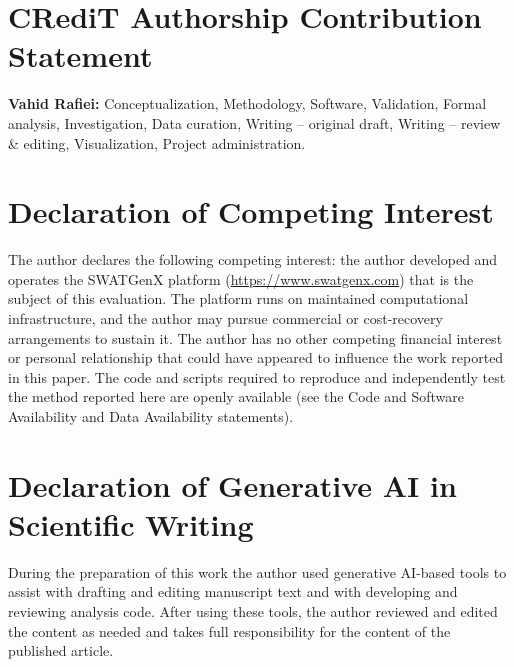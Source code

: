 \section*{CRediT Authorship Contribution Statement}

\textbf{Vahid Rafiei:} Conceptualization, Methodology, Software, Validation, Formal analysis, Investigation, Data curation, Writing -- original draft, Writing -- review \& editing, Visualization, Project administration.

\section*{Declaration of Competing Interest}

The author declares the following competing interest: the author developed and operates the SWATGenX platform (\url{https://www.swatgenx.com}) that is the subject of this evaluation. The platform runs on maintained computational infrastructure, and the author may pursue commercial or cost-recovery arrangements to sustain it. The author has no other competing financial interest or personal relationship that could have appeared to influence the work reported in this paper. The code and scripts required to reproduce and independently test the method reported here are openly available (see the Code and Software Availability and Data Availability statements).

\section*{Declaration of Generative AI in Scientific Writing}

During the preparation of this work the author used generative AI-based tools to assist with drafting and editing manuscript text and with developing and reviewing analysis code. After using these tools, the author reviewed and edited the content as needed and takes full responsibility for the content of the published article.
